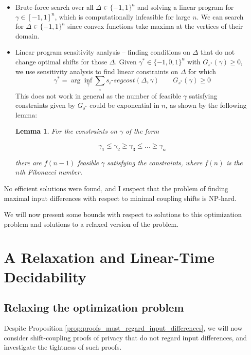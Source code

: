 \documentclass{article}
\newtheorem{lemma}[theorem]{Lemma}
\newcommand{\1}{\langle 1 \rangle}
\newcommand{\2}{\langle 2 \rangle}
\begin{document}
\begin{itemize}
    \item Brute-force search over all $\Delta \in \{-1, 1\}^n$ and solving a linear program for $\gamma \in [-1, 1]^n$, which is computationally infeasible for large $n$. We can search for $\Delta \in \{-1, 1\}^n$ since convex functions take maxima at the vertices of their domain.
    \item Linear program sensitivity analysis -- finding conditions on $\Delta$ that do not change optimal shifts for those $\Delta$. Given $\gamma^* \in \{-1, 0, 1\}^n$ with $G_{s^*}(\gamma) \geq 0$, we use sensitivity analysis to find linear constraints on $\Delta$ for which \[\gamma^* = \arg \inf_{\gamma} \sum_i s_i\text{-}segcost(\Delta, \gamma) \qquad G_{s^*}(\gamma) \geq 0\]
    This does not work in general as the number of feasible $\gamma$ satisfying constraints given by $G_{s^*}$ could be exponential in $n$, as shown by the following lemma: 

    \begin{lemma}
        For the constraints on $\gamma$ of the form 

        \[\gamma_1 \leq \gamma_2 \geq \gamma_3 \leq \dots \geq \gamma_n\]
        
        there are $f(n - 1)$ feasible $\gamma$ satisfying the constraints, where $f(n)$ is the $n$th Fibonacci number.
    \end{lemma}
\end{itemize}

No efficient solutions were found, and I suspect that the problem of finding maximal input differences with respect to minimal coupling shifts is NP-hard. 

We will now present some bounds with respect to solutions to this optimization problem and solutions to a relaxed version of the problem. 

\section{A Relaxation and Linear-Time Decidability}

\subsection{Relaxing the optimization problem}

Despite Proposition \ref{prop:proofs_must_regard_input_differences}, we will now consider shift-coupling proofs of privacy that do not regard input differences, and investigate the tightness of such proofs.
\end{document}
